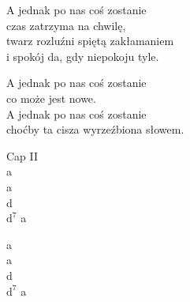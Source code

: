 
\begin{text}
    \hfill\break
    A jednak po nas coś zostanie\\
    czas zatrzyma na chwilę,\\
    twarz rozluźni spiętą zakłamaniem\\
    i spokój da, gdy niepokoju tyle.

    A jednak po nas coś zostanie\\
    co może jest nowe.\\
    A jednak po nas coś zostanie\\
    choćby ta cisza wyrzeźbiona słowem.
\end{text}
\begin{chord}
    Cap II\\
    a\\
    a\\
    d\\
    $\mathrm{d^7}$ a

    a\\
    a\\
    d\\
    $\mathrm{d^7}$ a
\end{chord}
